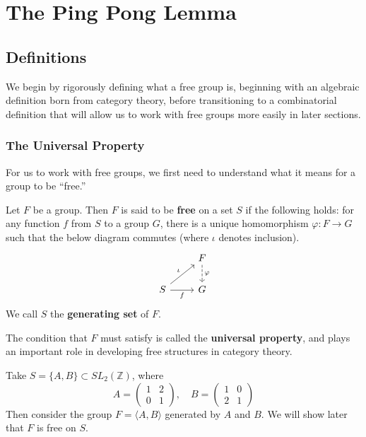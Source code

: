 \section{The Ping Pong Lemma}

\subsection{Definitions}

We begin by rigorously defining what a free group is, beginning with an algebraic definition born from category theory, before transitioning to a combinatorial definition that will allow us to work with free groups more easily in later sections.

\subsubsection{The Universal Property}\label{The Universal Property}

For us to work with free groups, we first need to understand what it means for a group to be ``free.'' 

\begin{defn}\label{Free Group Universal Property}
    Let $F$ be a group. Then $F$ is said to be \textbf{free} on a set $S$ if the following holds: for any function $f$ from $S$ to a group $G$, there is a unique homomorphism $\varphi: F \to G$ such that the below diagram commutes (where $\iota$ denotes inclusion).
    \[\begin{tikzcd}
        & {F} \\
        S & G
        \arrow["\varphi", dashed, from=1-2, to=2-2]
        \arrow["\iota",from=2-1, to=1-2]
        \arrow["f"', from=2-1, to=2-2]
    \end{tikzcd}\]
    We call $S$ the \textbf{generating set} of $F$. 
\end{defn}

The condition that $F$ must satisfy is called the \textbf{universal property}, and plays an important role in developing free structures in category theory. 

\begin{example}
    Take $S = \{A,B\} \subset SL_2(\mathbb{Z})$, where 
    \[A = \begin{pmatrix}
        1 & 2 \\ 0 & 1
    \end{pmatrix}, \quad B = \begin{pmatrix}
        1 & 0 \\ 2 & 1
    \end{pmatrix}\]
    Then consider the group $F = \langle A,B \rangle$ generated by $A$ and $B$. We will show later that $F$ is free on $S$. 
\end{example}

